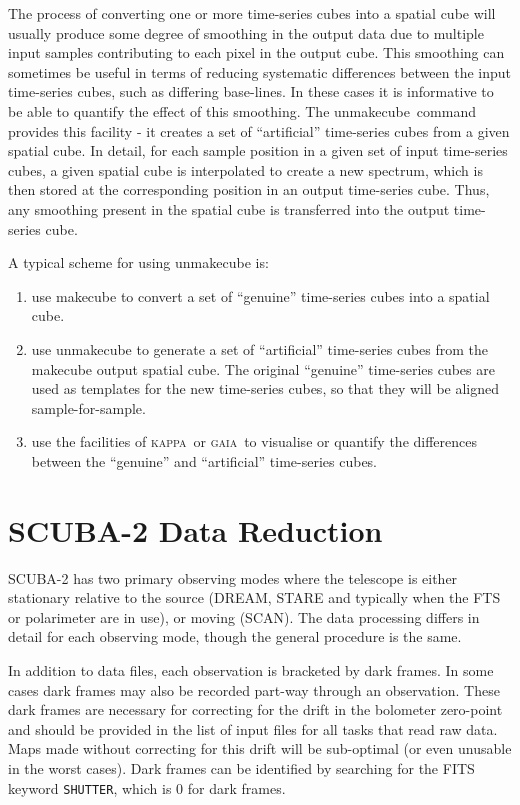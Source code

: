 \documentclass[twoside,11pt]{article}
\newcommand{\xref}[3]{#1}
\newcommand{\xlabel}[1]{}
\renewcommand{\_}{\texttt{\symbol{95}}}
\newcommand{\GAIA}{\textsc{gaia}}
\newcommand{\KAPPA}{\textsc{kappa}}
\newcommand{\task}[1]{\textsf{#1}}
\newcommand{\unmakecube}{\xref{\task{unmakecube}}{sun258}{UNMAKECUBE}}
\begin{document}
The process of converting one or more time-series cubes into a spatial
cube will usually produce some degree of smoothing in the output data due
to multiple input samples contributing to each pixel in the output cube.
This smoothing can sometimes be useful in terms of reducing systematic
differences between the input time-series cubes, such as differing
base-lines. In these cases it is informative to be able to quantify the
effect of this smoothing. The \unmakecube\ command provides this facility
- it creates a set of ``artificial'' time-series cubes from a given
spatial cube. In detail, for each sample position in a given set of input
time-series cubes, a given spatial cube is interpolated to create a new
spectrum, which is then stored at the corresponding position in an output
time-series cube. Thus, any smoothing present in the spatial cube is
transferred into the output time-series cube.

A typical scheme for using unmakecube is:

\begin{enumerate}
\item use makecube to convert a set of ``genuine'' time-series cubes into
a spatial cube.
\item use unmakecube to generate a set of ``artificial'' time-series cubes
from the makecube output spatial cube. The original ``genuine''
time-series cubes are used as templates for the new time-series cubes, so
that they will be aligned sample-for-sample.
\item use the facilities of \KAPPA\ or \GAIA\ to visualise or quantify the
differences between the ``genuine'' and ``artificial'' time-series cubes.
\end{enumerate}


\section{\xlabel{scuba2}SCUBA-2 Data Reduction\label{se:sc2dr}}

SCUBA-2 has two primary observing modes where the telescope is either
stationary relative to the source (DREAM, STARE and typically when the
FTS or polarimeter are in use), or moving (SCAN). The data processing
differs in detail for each observing mode, though the general
procedure is the same.

In addition to data files, each observation is bracketed by dark
frames. In some cases dark frames may also be recorded part-way
through an observation. These dark frames are necessary for correcting
for the drift in the bolometer zero-point and should be provided in
the list of input files for all tasks that read raw data. Maps made
without correcting for this drift will be sub-optimal (or even
unusable in the worst cases). Dark frames can be identified by
searching for the FITS keyword \texttt{SHUTTER}, which is 0 for dark
frames.
\end{document}
